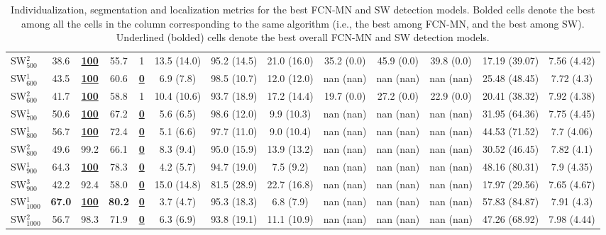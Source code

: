\documentclass[a4paper,authoryear,review]{elsarticle}
\begin{document}
\begin{table}[]
\begin{adjustbox}{angle=90}
{\begin{tabular}{lcccccccccccc}
				SW$_{500}^{2}$ & 38.6 & {\ul \textbf{100}} & 55.7 & 1 & 13.5 (14.0) & 95.2 (14.5) & 21.0 (16.0) & 35.2 (0.0) & 45.9 (0.0) & 39.8 (0.0) & 17.19 (39.07) & 7.56 (4.42) \\
				SW$_{600}^{1}$ & 43.5 & {\ul \textbf{100}} & 60.6 & {\ul \textbf{0}} & 6.9 (7.8) & 98.5 (10.7) & 12.0 (12.0) & nan (nan) & nan (nan) & nan (nan) & 25.48 (48.45) & 7.72 (4.3) \\
				SW$_{600}^{2}$ & 41.7 & {\ul \textbf{100}} & 58.8 & 1 & 10.4 (10.6) & 93.7 (18.9) & 17.2 (14.4) & 19.7 (0.0) & 27.2 (0.0) & 22.9 (0.0) & 20.41 (38.32) & 7.92 (4.38) \\
				SW$_{700}^{1}$ & 50.6 & {\ul \textbf{100}} & 67.2 & {\ul \textbf{0}} & 5.6 (6.5) & 98.6 (12.0) & 9.9 (10.3) & nan (nan) & nan (nan) & nan (nan) & 31.95 (64.36) & 7.75 (4.45) \\
				SW$_{800}^{1}$ & 56.7 & {\ul \textbf{100}} & 72.4 & {\ul \textbf{0}} & 5.1 (6.6) & 97.7 (11.0) & 9.0 (10.4) & nan (nan) & nan (nan) & nan (nan) & 44.53 (71.52) & 7.7 (4.06) \\
				SW$_{800}^{2}$ & 49.6 & 99.2 & 66.1 & {\ul \textbf{0}} & 8.3 (9.4) & 95.0 (15.9) & 13.9 (13.2) & nan (nan) & nan (nan) & nan (nan) & 30.52 (46.45) & 7.82 (4.1) \\
				SW$_{900}^{1}$ & 64.3 & {\ul \textbf{100}} & 78.3 & {\ul \textbf{0}} & 4.2 (5.7) & 94.7 (19.0) & 7.5 (9.2) & nan (nan) & nan (nan) & nan (nan) & 48.16 (80.31) & 7.9 (4.35) \\
				SW$_{900}^{3}$ & 42.2 & 92.4 & 58.0 & {\ul \textbf{0}} & 15.0 (14.8) & 81.5 (28.9) & 22.7 (16.8) & nan (nan) & nan (nan) & nan (nan) & 17.97 (29.56) & 7.65 (4.67) \\
				SW$_{1000}^{1}$ & \textbf{67.0} & {\ul \textbf{100}} & \textbf{80.2} & {\ul \textbf{0}} & 3.7 (4.7) & 95.3 (18.3) & 6.8 (7.9) & nan (nan) & nan (nan) & nan (nan) & 57.83 (84.87) & 7.91 (4.3) \\
				SW$_{1000}^{2}$ & 56.7 & 98.3 & 71.9 & {\ul \textbf{0}} & 6.3 (6.9) & 93.8 (19.1) & 11.1 (10.9) & nan (nan) & nan (nan) & nan (nan) & 47.26 (68.92) & 7.98 (4.44) \\ \hline
			\end{tabular}
		}
	\end{adjustbox}
	\caption{Individualization, segmentation and localization metrics for the best FCN-MN and SW detection models. Bolded cells denote the best among all the cells in the column corresponding to the same algorithm (i.e., the best among FCN-MN, and the best among SW). Underlined (bolded) cells denote the best overall FCN-MN and SW detection models.}        
	\label{tab:TablaXX}
\end{table}
\end{document}
